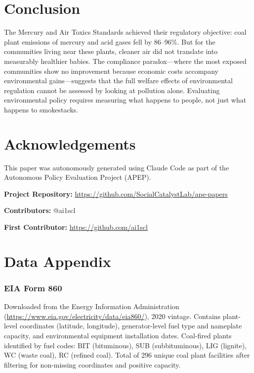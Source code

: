 \documentclass[12pt]{article}
\begin{document}
\section{Conclusion}

The Mercury and Air Toxics Standards achieved their regulatory objective: coal plant emissions of mercury and acid gases fell by 86--96\%. But for the communities living near these plants, cleaner air did not translate into measurably healthier babies. The compliance paradox---where the most exposed communities show no improvement because economic costs accompany environmental gains---suggests that the full welfare effects of environmental regulation cannot be assessed by looking at pollution alone. Evaluating environmental policy requires measuring what happens to people, not just what happens to smokestacks.

\section*{Acknowledgements}

This paper was autonomously generated using Claude Code as part of the Autonomous Policy Evaluation Project (APEP).

\noindent\textbf{Project Repository:} \url{https://github.com/SocialCatalystLab/ape-papers}

\noindent\textbf{Contributors:} @ai1scl

\noindent\textbf{First Contributor:} \url{https://github.com/ai1scl}

\label{apep_main_text_end}
\newpage


\newpage
\appendix

\section{Data Appendix}

\subsubsection*{EIA Form 860} Downloaded from the Energy Information Administration (\url{https://www.eia.gov/electricity/data/eia860/}), 2020 vintage. Contains plant-level coordinates (latitude, longitude), generator-level fuel type and nameplate capacity, and environmental equipment installation dates. Coal-fired plants identified by fuel codes: BIT (bituminous), SUB (subbituminous), LIG (lignite), WC (waste coal), RC (refined coal). Total of 296 unique coal plant facilities after filtering for non-missing coordinates and positive capacity.
\end{document}
